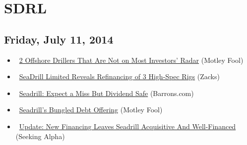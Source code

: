 \documentclass[11pt,asymmetric]{article}
\begin{document}
\section*{SDRL}

\subsection*{Friday, July 11, 2014}
\begin{itemize}
\item\ \href{http://www.fool.com/investing/general/2014/07/11/2-offshore-drillers-that-are-under-the-radar-of-mo.aspx?source=eogyholnk0000001}{2 Offshore Drillers That Are Not on Most Investors' Radar} (Motley Fool)
\item\ \href{http://finance.yahoo.com/news/seadrill-limited-reveals-refinancing-3-182007004.html}{SeaDrill Limited Reveals Refinancing of 3 High-Spec Rigs} (Zacks)
\item\ \href{http://blogs.barrons.com/stockstowatchtoday/2014/07/11/seadrill-expect-a-miss-but-dividend-safe/?mod=yahoobarrons&ru=yahoo}{Seadrill: Expect a Miss But Dividend Safe} (Barrons.com)
\item\ \href{http://www.fool.com/investing/general/2014/07/11/seadrills-bungled-debt-offering.aspx?source=eogyholnk0000001}{Seadrill's Bungled Debt Offering} (Motley Fool)
\item\ \href{http://seekingalpha.com/article/2310295-update-new-financing-leaves-seadrill-acquisitive-and-well-financed?source=yahoo}{Update: New Financing Leaves Seadrill Acquisitive And Well-Financed} (Seeking Alpha)
\end{itemize}
\end{document}
